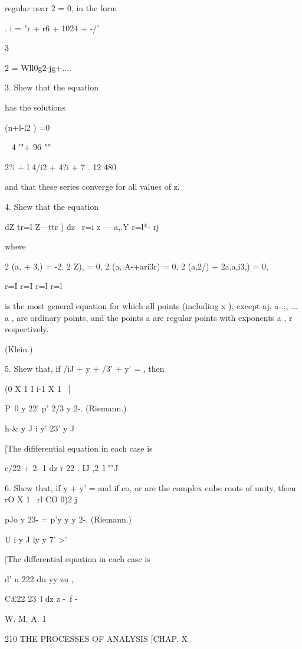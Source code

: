 regular near 2 = 0, in the form

. i = "r + r6 + 1024 + -/'

3

 2 = Wll0g2-jg+....

3. Shew that the equation






has the solutions



(n+l-l2 ) =0



 ~ 4 '"+ 96 "''

2?i + l 4/i2 + 4?i + 7 . 12 480



and that these series converge for all values of z.

4. Shew that the equation

dZ tr=l Z—ttr ) dz \ r=i z — a,.Y r=l*- rj

where

2 (a, + 3,) = -2, 2 Z), = 0, 2 (a, A-+ari3r) = 0, 2 (a,2/) + 2a,a,i3,)
= 0,

r=I r=I r=l r=l

is the most general equation for which all points (including x ),
except aj, a-.,, ... a , are ordinary points, and the points a are
regular points with exponents a , r respectively.

(Klein.)

5. Shew that, if /iJ + y + /3' + y' = , then

(0 X 1 I i-1 X 1 ~|



P\ 0 y 22' p' 2/3 y 2-. (Riemann.)

h \& y J i y' 23' y J

[The dififerential equation in each case is

c/22 + 2- 1 dz r 22 . IJ ,2\ l ""J

6. Shew that, if y + y' = and if co, or are the complex cube roots of
unity, tfeen rO X 1 \ rl CO 0)2 j

pJo y 23- = p'y y y 2-. (Riemann.)

U i y J ly y 7' >'

[The differential equation in each case is

d' u 222 du yy zu ,

C£22 23\ l dz z -\ f -

W. M. A. 1



210 THE PROCESSES OF ANALYSIS [CHAP. X

